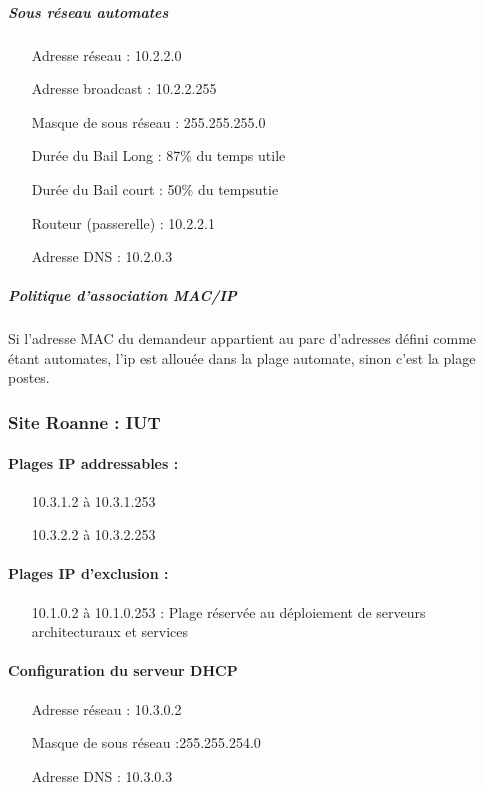 \documentclass[a4paper]{article}
\begin{document}
\subparagraph{Sous réseau automates}
\begin{itemize}
\item[Adresse réseau]: 10.2.2.0
\item[Adresse broadcast]: 10.2.2.255
\item[Masque de sous réseau]: 255.255.255.0
\item[Durée du Bail Long]: 87\% du temps utile
\item[Durée du Bail court]: 50\% du tempsutie
\item[Routeur (passerelle)]: 10.2.2.1
\item[Adresse DNS]: 10.2.0.3
\end{itemize}

\subparagraph{Politique d'association MAC/IP}
Si l'adresse MAC du demandeur appartient au parc d'adresses défini comme étant automates, l'ip est allouée dans la plage automate, sinon c'est la plage postes.


\subsubsection{Site Roanne : IUT}

\paragraph{Plages IP addressables :} 
\begin{itemize}
\item[10.3.1.2 à 10.3.1.253]
\item[10.3.2.2 à 10.3.2.253]
\end{itemize}

\paragraph{Plages IP d'exclusion :}
\begin{itemize}
\item[10.1.0.2 à 10.1.0.253] : Plage réservée au déploiement de serveurs architecturaux et services
\end{itemize}

\paragraph{Configuration du serveur DHCP}

\begin{itemize}
\item[Adresse réseau]: 10.3.0.2
\item[Masque de sous réseau]:255.255.254.0
\item[Adresse DNS]: 10.3.0.3
\end{itemize}
\end{document}
